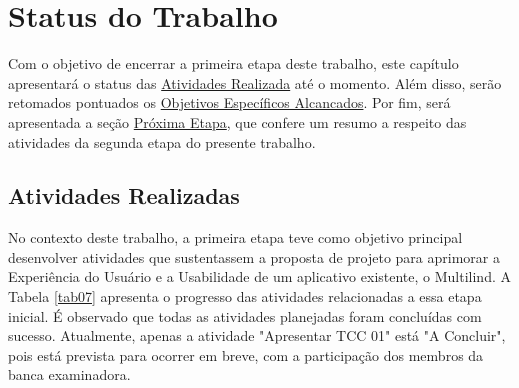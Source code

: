 \chapter[Status do Trabalho]{Status do Trabalho}
\label{chap:Status}
Com o objetivo de encerrar a primeira etapa deste trabalho, este capítulo apresentará o status das \hyperref[sec:Atividades Realizadas]{Atividades
Realizada} até o momento. Além disso, serão retomados pontuados os \hyperref[sec:Objetivos Especificos Alcancados]{Objetivos Específicos Alcancados}. 
Por fim, será apresentada a seção \hyperref[sec:Proxima Etapa]{Próxima Etapa}, que confere um resumo a respeito das atividades da segunda etapa do presente trabalho.

\section{Atividades Realizadas}
\label{sec:Atividades Realizadas}
No contexto deste trabalho, a primeira etapa teve como objetivo principal desenvolver atividades que sustentassem a proposta 
de projeto para aprimorar a Experiência do Usuário e a Usabilidade de um aplicativo existente, o Multilind. A Tabela \ref{tab07} apresenta 
o progresso das atividades relacionadas a essa etapa inicial. É observado que todas as atividades planejadas foram concluídas com sucesso. 
Atualmente, apenas a atividade "Apresentar TCC 01" está "A Concluir", pois está prevista para ocorrer em breve, com a participação dos membros da banca 
examinadora.

